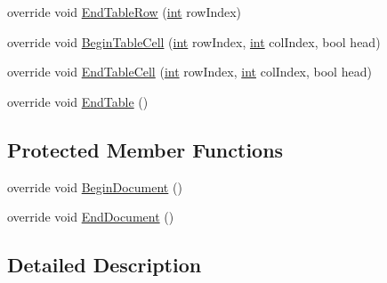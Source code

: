 \begin{DoxyCompactItemize}
\item 
override void \hyperlink{class_software_engineering_tools_1_1_documentation_1_1_latex_generator_a2bdf8d06abfbbd14a61098d04f257811}{End\+Table\+Row} (\hyperlink{namespace_software_engineering_tools_1_1_documentation_a4a8017aa254d1d05b03db5132b7dd3a7afa7153f7ed1cb6c0fcf2ffb2fac21748}{int} row\+Index)
\item 
override void \hyperlink{class_software_engineering_tools_1_1_documentation_1_1_latex_generator_a332122bd834cdb6857fab0d76032ffe8}{Begin\+Table\+Cell} (\hyperlink{namespace_software_engineering_tools_1_1_documentation_a4a8017aa254d1d05b03db5132b7dd3a7afa7153f7ed1cb6c0fcf2ffb2fac21748}{int} row\+Index, \hyperlink{namespace_software_engineering_tools_1_1_documentation_a4a8017aa254d1d05b03db5132b7dd3a7afa7153f7ed1cb6c0fcf2ffb2fac21748}{int} col\+Index, bool head)
\item 
override void \hyperlink{class_software_engineering_tools_1_1_documentation_1_1_latex_generator_a9578ee4b9d513bfcce6b67e60edf2daa}{End\+Table\+Cell} (\hyperlink{namespace_software_engineering_tools_1_1_documentation_a4a8017aa254d1d05b03db5132b7dd3a7afa7153f7ed1cb6c0fcf2ffb2fac21748}{int} row\+Index, \hyperlink{namespace_software_engineering_tools_1_1_documentation_a4a8017aa254d1d05b03db5132b7dd3a7afa7153f7ed1cb6c0fcf2ffb2fac21748}{int} col\+Index, bool head)
\item 
override void \hyperlink{class_software_engineering_tools_1_1_documentation_1_1_latex_generator_a7cce6ca1e8aa6b8cef90411891514e03}{End\+Table} ()
\end{DoxyCompactItemize}
\subsection*{Protected Member Functions}
\begin{DoxyCompactItemize}
\item 
override void \hyperlink{class_software_engineering_tools_1_1_documentation_1_1_latex_generator_a415cd0402059b26675d15c4679013635}{Begin\+Document} ()
\item 
override void \hyperlink{class_software_engineering_tools_1_1_documentation_1_1_latex_generator_a24103014a84ca959b9df44d9c298af48}{End\+Document} ()
\end{DoxyCompactItemize}


\subsection{Detailed Description}


